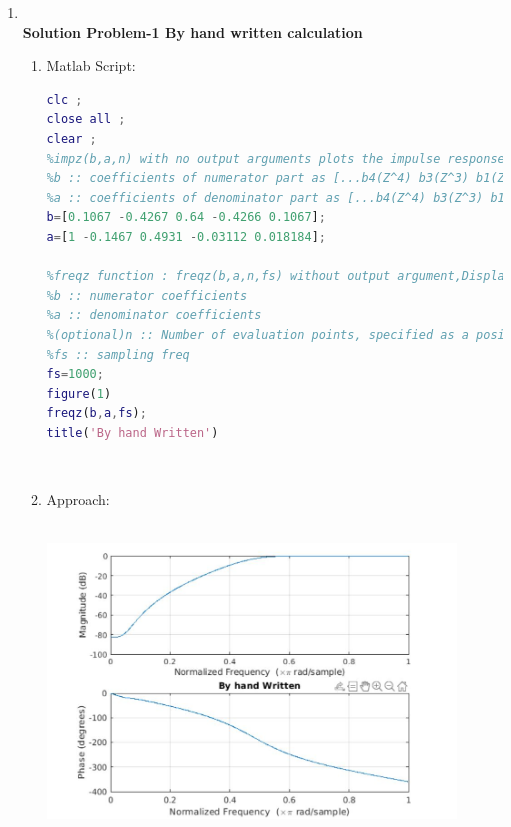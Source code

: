 \documentclass{article}
\begin{document}
\begin{enumerate}
\item \large  \\
\textbf{Solution Problem-1 By hand written calculation}
\begin{enumerate}

	\item Matlab Script: 
	\begin{lstlisting}[language=Matlab]
clc ;
close all ;
clear ;
%impz(b,a,n) with no output arguments plots the impulse response of the digital filter with numerator coefficients b and denominator coefficients a.
%b :: coefficients of numerator part as [...b4(Z^4) b3(Z^3) b1(Z^2) b1(Z^1) b0(Z^0) b(-1)(Z^-1) b(-2)(Z^-2) b(-3)(Z^-3) ..]
%a :: coefficients of denominator part as [...b4(Z^4) b3(Z^3) b1(Z^2) b1(Z^1) b0(Z^0) b(-1)(Z^-1) b(-2)(Z^-2) b(-3)(Z^-3) ..]
b=[0.1067 -0.4267 0.64 -0.4266 0.1067];
a=[1 -0.1467 0.4931 -0.03112 0.018184];

%freqz function : freqz(b,a,n,fs) without output argument,Display the magnitude and phase responses of the filter.
%b :: numerator coefficients
%a :: denominator coefficients
%(optional)n :: Number of evaluation points, specified as a positive integer scalar no less than 2. When n is absent, it defaults to 512. For best results, set n to a value greater than the filter order.
%fs :: sampling freq
fs=1000;
figure(1)
freqz(b,a,fs);
title('By hand Written')

\end{lstlisting}
\\	
    \item Approach:\\
    
   \\

	\begin{center}
    \includegraphics[width=0.9\textwidth]{A9_1_1.JPG}
    \end{center}
\end{enumerate}	
\\


\end{enumerate}
\end{document}
